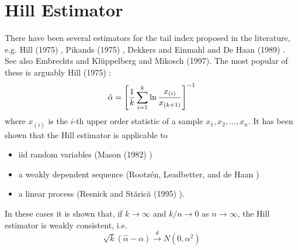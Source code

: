 \documentclass{article}
\newcommand{\1}[1]{
  \mathbf{1}_{\{#1\}}
}
\begin{document}
\section{Hill Estimator}
\label{sec:Hill}
There have been several estimators for the tail index proposed in the
literature, e.g. Hill (1975) \cite{hill1975simple}, Pikands (1975)
\cite{pickands1975statistical}, Dekkers and Einmahl and De Haan (1989)
\cite{dekkers1989moment}. See also Embrechts and Kl\"uppelberg and
Mikosch (1997)\cite{Embrechts1997}. The most popular of these is
arguably Hill (1975) \cite{hill1975simple}:
\[
\hat \alpha = \left[
  {1 \over k} \sum_{i=1}^k \ln {x_{(i)} \over x_{(k+1)}}
  \right]^{-1}
\]
where $x_{(i)}$ is the $i$-th upper order statistic of a sample
$x_1, x_2, ..., x_n$. It has been shown that the Hill estimator is
applicable to 
\begin{itemize}
\item iid random variables (Mason (1982) \cite{mason1982laws})
\item a weakly dependent sequence (Rootz{\'e}n, Leadbetter,
  and de Haan \cite{rootzen1992tail})
\item a linear process (Resnick and St{\u{a}}ric{\u{a}} (1995)
  \cite{resnick1995consistency}).
\end{itemize}
In these cases it is shown that, if $k \to \infty$ and $k/n \to 0$
as $n \to \infty$, the Hill estimator is weakly consistent, i.e.
\[
\sqrt k (\hat \alpha - \alpha) \overset{d}{\to} N(0, \alpha^2)
\]
\end{document}
